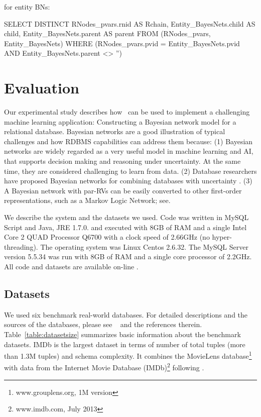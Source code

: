 for entity BNs:

 SELECT DISTINCT
        RNodes\_pvars.rnid AS Rchain,
        Entity\_BayesNets.child AS child,
        Entity\_BayesNets.parent AS parent
    FROM
        (RNodes\_pvars, Entity\_BayesNets)
    WHERE
        (RNodes\_pvars.pvid = Entity\_BayesNets.pvid
            AND Entity\_BayesNets.parent <> '') 
            
\section{Evaluation} 
Our experimental study describes how \FB\ can be used to implement a challenging machine learning application: Constructing a Bayesian network model for a relational database. Bayesian networks are a good illustration of typical challenges and how RDBMS capabilities can address them because: (1) Bayesian networks are widely regarded as a very useful model %
 in machine learning and AI, that supports decision making and reasoning under uncertainty. At the same time, they are considered challenging to learn from data. (2) Database researchers have proposed Bayesian networks for combining databases with uncertainty%
\cite{Wang2008}. (3) A Bayesian network with par-RVs can be easily converted to other first-order representations, such as a Markov Logic Network; see\cite{Domingos2009}.

We describe the system and the datasets we used.
Code was written in MySQL Script and Java, JRE 1.7.0.  and executed with 8GB of RAM and a single Intel Core 2 QUAD Processor Q6700 with a clock speed of 2.66GHz (no hyper-threading). The operating system was Linux Centos 2.6.32. 
The MySQL Server version 5.5.34 was run with 8GB of RAM and a single core processor of 2.2GHz. 
All code and datasets are available on-line \cite{bib:bbsite}. 


\subsection{Datasets} \label{sec:datasets}
We used six benchmark real-world databases. For detailed descriptions and  the sources of the databases, please see ~\cite{bib:bbsite} and the references therein. Table~\ref{table:datasetsize} summarizes basic information about the benchmark datasets.  
IMDb is the largest dataset in terms of number of total tuples (more than 1.3M tuples) and schema complexity. %
It combines the MovieLens database\footnote{www.grouplens.org, 1M version} with data from the Internet Movie Database (IMDb)\footnote{www.imdb.com, July 2013} following \cite{Peralta2007}. 


